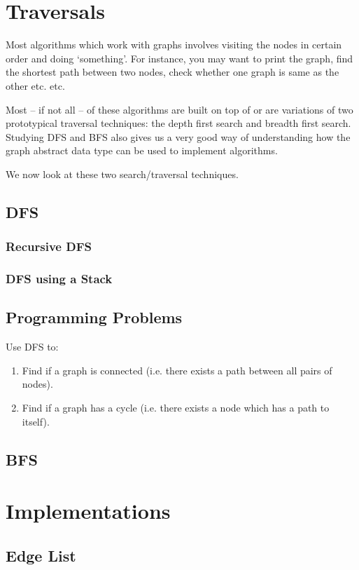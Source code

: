 \documentclass[12pt,a4paper]{article}
\begin{document}
\section{Traversals}
Most algorithms which work with graphs involves visiting the nodes in certain order and doing `something'. For instance, you may want to print the graph, find the shortest path between two nodes, check whether one graph is same as the other etc. etc.

Most -- if not all -- of these algorithms are built on top of or are variations of two prototypical traversal techniques: the depth first search and breadth first search. Studying DFS and BFS also gives us a very good way of understanding how the graph abstract data type can be used to implement algorithms.

We now look at these two search/traversal techniques.

\subsection{DFS}
\subsubsection{Recursive DFS}
\subsubsection{DFS using a Stack}

\subsection{Programming Problems}
Use DFS to:
\begin{enumerate}
\item Find if a graph is connected (i.e. there exists a path between all pairs of nodes).
\item Find if a graph has a cycle (i.e. there exists a node which has a path to itself).
\end{enumerate}
\subsection{BFS}

\section{Implementations}
\subsection{Edge List}
\end{document}
